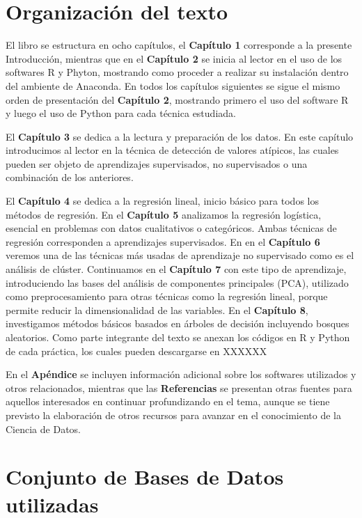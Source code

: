 \documentclass[12pt,]{krantz}
\begin{document}
\hypertarget{organizacion-del-texto}{%
\section{Organización del texto}\label{organizacion-del-texto}}

El libro se estructura en ocho capítulos, el \textbf{Capítulo 1} corresponde a la presente Introducción, mientras que en el \textbf{Capítulo 2} se inicia al lector en el uso de los softwares R y Phyton, mostrando como proceder a realizar su instalación dentro del ambiente de Anaconda. En todos los capítulos siguientes se sigue el mismo orden de presentación del \textbf{Capítulo 2}, mostrando primero el uso del software R y luego el uso de Python para cada técnica estudiada.

El \textbf{Capítulo 3} se dedica a la lectura y preparación de los datos. En este capítulo introducimos al lector en la técnica de detección de valores atípicos, las cuales pueden ser objeto de aprendizajes supervisados, no supervisados o una combinación de los anteriores.

El \textbf{Capítulo 4} se dedica a la regresión lineal, inicio básico para todos los métodos de regresión. En el \textbf{Capítulo 5} analizamos la regresión logística, esencial en problemas con datos cualitativos o categóricos. Ambas técnicas de regresión corresponden a aprendizajes supervisados. En en el \textbf{Capítulo 6} veremos una de las técnicas más usadas de aprendizaje no supervisado como es el análisis de clúster. Continuamos en el \textbf{Capítulo 7} con este tipo de aprendizaje, introduciendo las bases del análisis de componentes principales (PCA), utilizado como preprocesamiento para otras técnicas como la regresión lineal, porque permite reducir la dimensionalidad de las variables. En el \textbf{Capítulo 8}, investigamos métodos básicos basados en árboles de decisión incluyendo bosques aleatorios.
Como parte integrante del texto se anexan los códigos en R y Python de cada práctica, los cuales pueden descargarse en XXXXXX

En el \textbf{Apéndice} se incluyen información adicional sobre los softwares utilizados y otros relacionados, mientras que las \textbf{Referencias} se presentan otras fuentes para aquellos interesados en continuar profundizando en el tema, aunque se tiene previsto la elaboración de otros recursos para avanzar en el conocimiento de la Ciencia de Datos.

\hypertarget{conjunto-de-bases-de-datos-utilizadas}{%
\section{Conjunto de Bases de Datos utilizadas}\label{conjunto-de-bases-de-datos-utilizadas}}
\end{document}
